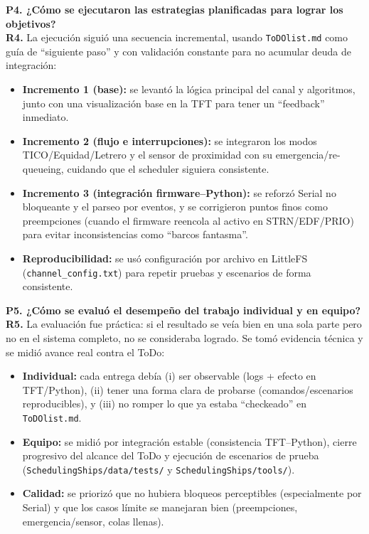 \documentclass[journal]{IEEEtran}
\begin{document}
\textbf{P4. ¿Cómo se ejecutaron las estrategias planificadas para lograr los objetivos?}\\
\textbf{R4.} La ejecución siguió una secuencia incremental, usando \texttt{ToDOlist.md} como guía de “siguiente paso” y con validación constante para no acumular deuda de integración:
\begin{itemize}
	\item \textbf{Incremento 1 (base):} se levantó la lógica principal del canal y algoritmos, junto con una visualización base en la TFT para tener un “feedback” inmediato.
	\item \textbf{Incremento 2 (flujo e interrupciones):} se integraron los modos TICO/Equidad/Letrero y el sensor de proximidad con su emergencia/re-queueing, cuidando que el scheduler siguiera consistente.
	\item \textbf{Incremento 3 (integración firmware--Python):} se reforzó Serial no bloqueante y el parseo por eventos, y se corrigieron puntos finos como preempciones (cuando el firmware reencola al activo en STRN/EDF/PRIO) para evitar inconsistencias como “barcos fantasma”.
	\item \textbf{Reproducibilidad:} se usó configuración por archivo en LittleFS (\texttt{channel\_config.txt}) para repetir pruebas y escenarios de forma consistente.
\end{itemize}

\textbf{P5. ¿Cómo se evaluó el desempeño del trabajo individual y en equipo?}\\
\textbf{R5.} La evaluación fue práctica: si el resultado se veía bien en una sola parte pero no en el sistema completo, no se consideraba logrado. Se tomó evidencia técnica y se midió avance real contra el ToDo:
\begin{itemize}
	\item \textbf{Individual:} cada entrega debía (i) ser observable (logs + efecto en TFT/Python), (ii) tener una forma clara de probarse (comandos/escenarios reproducibles), y (iii) no romper lo que ya estaba “checkeado” en \texttt{ToDOlist.md}.
	\item \textbf{Equipo:} se midió por integración estable (consistencia TFT--Python), cierre progresivo del alcance del ToDo y ejecución de escenarios de prueba (\texttt{SchedulingShips/data/tests/} y \texttt{SchedulingShips/tools/}).
	\item \textbf{Calidad:} se priorizó que no hubiera bloqueos perceptibles (especialmente por Serial) y que los casos límite se manejaran bien (preempciones, emergencia/sensor, colas llenas).
\end{itemize}
\end{document}
